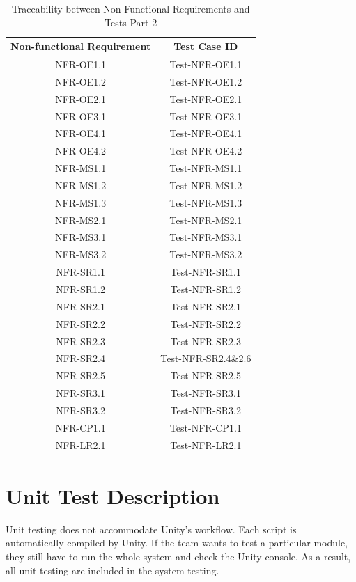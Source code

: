 \documentclass[12pt, titlepage]{article}
\begin{document}
\begin{table}[H]
    \centering
    \begin{tabular}{|c|c|}
    \hline
    Non-functional Requirement & Test Case ID\\
    \hline
    NFR-OE1.1 & Test-NFR-OE1.1\\
    \hline
    NFR-OE1.2 & Test-NFR-OE1.2\\
    \hline
    NFR-OE2.1 & Test-NFR-OE2.1\\
    \hline
    NFR-OE3.1 & Test-NFR-OE3.1\\
    \hline
    NFR-OE4.1 & Test-NFR-OE4.1\\
    \hline
    NFR-OE4.2 & Test-NFR-OE4.2\\
    \hline
    NFR-MS1.1 & Test-NFR-MS1.1\\
    \hline
    NFR-MS1.2 & Test-NFR-MS1.2\\
    \hline
    NFR-MS1.3 & Test-NFR-MS1.3\\
    \hline
    NFR-MS2.1 & Test-NFR-MS2.1\\
    \hline
    NFR-MS3.1 & Test-NFR-MS3.1\\
    \hline
    NFR-MS3.2 & Test-NFR-MS3.2\\
    \hline
    NFR-SR1.1 & Test-NFR-SR1.1\\
    \hline
    NFR-SR1.2 & Test-NFR-SR1.2\\
    \hline
    NFR-SR2.1 & Test-NFR-SR2.1\\
    \hline
    NFR-SR2.2 & Test-NFR-SR2.2\\
    \hline
    NFR-SR2.3 & Test-NFR-SR2.3\\
    \hline
    NFR-SR2.4 & Test-NFR-SR2.4\&2.6\\
    \hline
    NFR-SR2.5 & Test-NFR-SR2.5\\
    \hline
    NFR-SR3.1 & Test-NFR-SR3.1\\
    \hline
    NFR-SR3.2 & Test-NFR-SR3.2\\
    \hline
    NFR-CP1.1 & Test-NFR-CP1.1\\
    \hline
    NFR-LR2.1 & Test-NFR-LR2.1\\
    \hline
    \end{tabular}
    \caption{Traceability between Non-Functional Requirements and Tests Part 2}
\end{table}

\newpage

\section{Unit Test Description}
Unit testing does not accommodate Unity's workflow. Each script
is  automatically compiled by Unity. If the team wants to test a 
particular module, they still have to run the whole system and
check the Unity console. As a result, all unit testing are
included in the system testing. 
\end{document}
